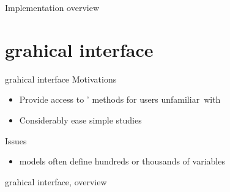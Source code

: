 \documentclass{beamer}
\begin{document}
\begin{frame}{Implementation overview}
\tikzexternaldisable{}

\newcommand{\nudge}{10mm}
\makebox[\textwidth][c]{\centering

}\end{frame}

\section{\otfmi{} grahical interface}

\begin{frame}{\otfmi{} grahical interface}
Motivations
\begin{itemize}
\item Provide access to \openturns{}' methods for \lmodelica{} users unfamiliar~with~\lpython{}
\item Considerably ease simple studies
\end{itemize}
\vfill
Issues
\begin{itemize}
\item \lmodelica{} models often define \alert{hundreds or thousands of variables}
\end{itemize}
\end{frame}

\begin{frame}{\otfmi{} grahical interface, \fmu{} overview}
\end{frame}
\end{document}

